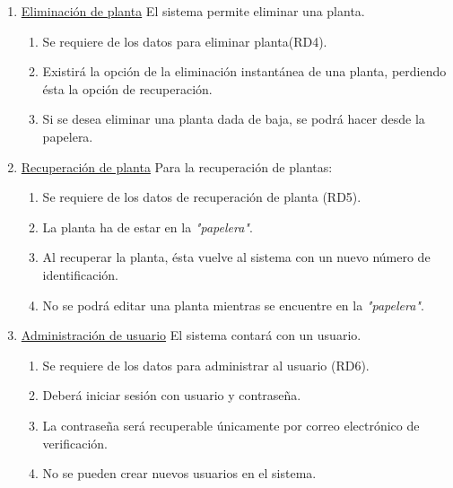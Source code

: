 \documentclass[10pt,a4paper]{article}
\begin{document}
\begin{enumerate}[label=RF\arabic*. ,leftmargin=2.8\parindent]
	\bigskip
	\item \underline{Eliminación de planta}
	\newline \newline
	El sistema permite eliminar una planta.
	\begin{enumerate}[label=-]
	\item Se requiere de los datos para eliminar planta(RD4).
		\item Existirá la opción de la eliminación instantánea de una planta, perdiendo ésta la opción de recuperación.
		\item Si se desea eliminar una planta dada de baja, se podrá hacer desde la papelera.
	\end{enumerate}

	\bigskip
	\item \underline{Recuperación de planta}
	\newline \newline
	Para la recuperación de plantas:
	\begin{enumerate}[label=-]
	\item Se requiere de los datos de recuperación de planta (RD5).
	\item La planta ha de estar en la \textit{"papelera"}.
	\item Al recuperar la planta, ésta vuelve al sistema con un nuevo número de identificación.
	\item No se podrá editar una planta mientras se encuentre en la \textit{"papelera"}.
	\end{enumerate}

	\bigskip
	\item \underline{Administración de usuario}
	\newline \newline
	El sistema contará con un usuario.
	\begin{enumerate}[label=-]
	\item Se requiere de los datos para administrar al usuario (RD6).
		\item Deberá iniciar sesión con usuario y contraseña.
		\item La contraseña será recuperable únicamente por correo electrónico de verificación.
		\item No se pueden crear nuevos usuarios en el sistema.
		
	\end{enumerate}


\end{enumerate}
\end{document}
